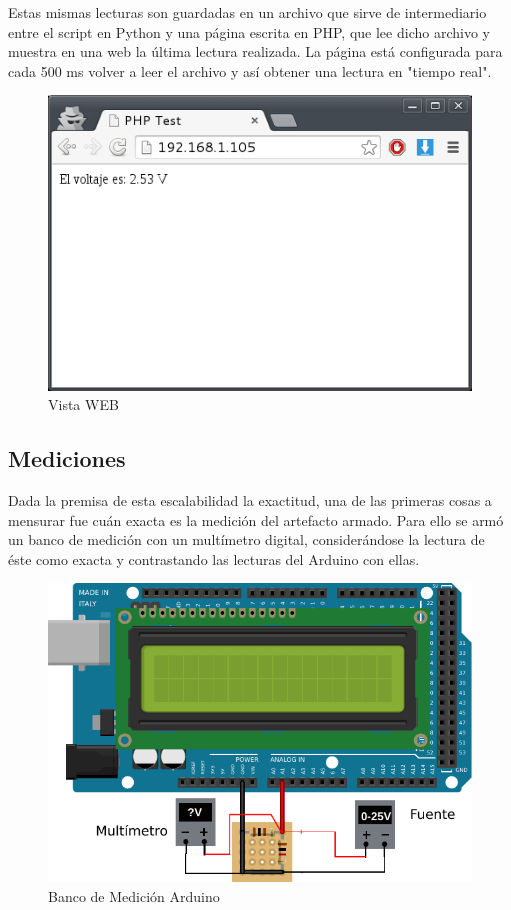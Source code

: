 \documentclass[12pt,a4paper]{article}
\begin{document}
			Estas mismas lecturas son guardadas en un archivo que sirve de intermediario entre el script en Python y una página escrita en PHP, que lee dicho archivo y muestra en una web la última lectura realizada. La página está configurada para cada 500 ms volver a leer el archivo y así obtener una lectura en "tiempo real".

			\begin{figure}[H]
			\centering
				\includegraphics[scale=0.7]{images/Screenshot4.png}\caption{Vista WEB}
			\end{figure}

		\subsection{Mediciones}

			Dada la premisa de esta escalabilidad la exactitud, una de las primeras cosas a mensurar fue cuán exacta es la medición del artefacto armado. Para ello se armó un banco de medición con un multímetro digital, considerándose la lectura de éste como exacta y contrastando las lecturas del Arduino con ellas.

			\begin{figure}[H]
			\centering
				\includegraphics[scale=1.2]{images/arduino2.pdf}\caption{Banco de Medición Arduino}
			\end{figure}
\end{document}
